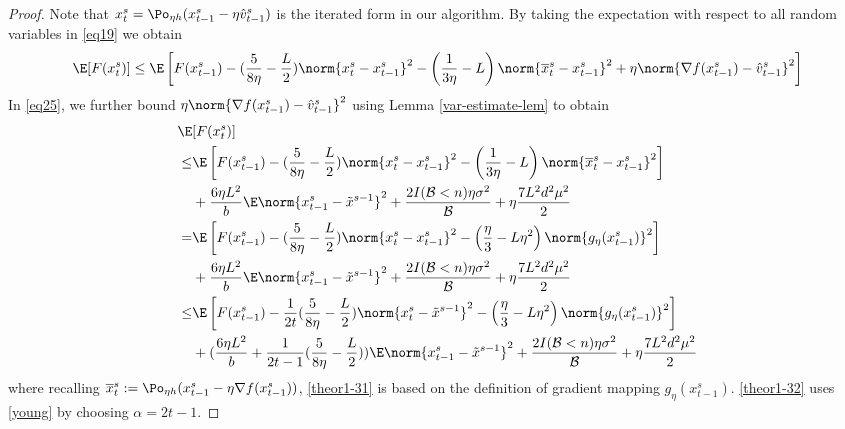 \begin{proof}
Note that $x_t^s = \Po_{\eta h}(x_{t-1}^s - \eta \hat{v}_{t-1}^s)$ is the iterated form in our algorithm.  By taking the expectation with respect to all random variables in \eqref{eq19} we obtain
 \begin{equation}\label{eq25}
 \begin{split} 
\E[F({x}_{t}^s)] \leq \E\left[F({x}_{t-1}^s)  -(\frac{5}{8\eta} - \frac{L}{2})\norm{{x}_t^s-x_{t-1}^s}^2- \left(\frac{1}{3\eta}-L\right)\norm{\overline{x}_t^s-x_{t-1}^s}^2+\eta \norm{\nabla f(x_{t-1}^s)-\hat{v}_{t-1}^s}^2\right]\\
 \end{split}
 \end{equation}
In \eqref{eq25}, we further bound $\eta \norm{\nabla f(x_{t-1}^s)-\hat{v}_{t-1}^s}^2$ using Lemma \ref{var-estimate-lem} to obtain
 \begin{align} 
\E&[F({x}_{t}^s)] \notag
\notag
\\ \leq& \E\left[F({x}_{t-1}^s)  -(\frac{5}{8\eta} - \frac{L}{2})\norm{{x}_t^s-x_{t-1}^s}^2- \left(\frac{1}{3\eta}-L\right)\norm{\overline{x}_t^s-x_{t-1}^s}^2\right]\notag\\
&+ \frac{6\eta L^2}{b}\E\norm{x_{t-1}^s-\tilde{x}^{s-1}}^2 + \frac{2I(\mathcal{B} < n)\eta \sigma ^2}{\mathcal{B}}+\eta \frac{7 L^2 d^2 \mu^2}{2}\notag
\\ =& \E\left[F({x}_{t-1}^s)  -(\frac{5}{8\eta} - \frac{L}{2})\norm{{x}_t^s-x_{t-1}^s}^2- \left(\frac{\eta}{3}-L\eta^2\right)\norm{g_{\eta}(x_{t-1}^s)}^2\right]\notag
\\&+\frac{6\eta L^2}{b}\E\norm{x_{t-1}^s-\tilde{x}^{s-1}}^2+ \frac{2I(\mathcal{B} < n)\eta \sigma ^2}{\mathcal{B}}+\eta \frac{7L^2 d^2 \mu^2}{2}\label{theor1-31}
\\ \leq& \E\left[F({x}_{t-1}^s)  -\frac{1}{2t}(\frac{5}{8\eta} - \frac{L}{2})\norm{{x}_t^s-\tilde{x}^{s-1}}^2- \left(\frac{\eta}{3}-L\eta^2\right)\norm{g_{\eta}(x_{t-1}^s)}^2\right]\notag\\
&+(\frac{6\eta L^2}{b}+\frac{1}{2t-1}(\frac{5}{8\eta} - \frac{L}{2}))\E\norm{x_{t-1}^s-\tilde{x}^{s-1}}^2
+ \frac{2I(\mathcal{B} < n)\eta \sigma ^2}{\mathcal{B}}+\eta \frac{7 L^2 d^2 \mu^2}{2}\label{theor1-32}
 \end{align}
where recalling $\overline{x}_t^s := \Po_{\eta h}(x_{t-1}^s - \eta \nabla f(x_{t-1}^s))$, \eqref{theor1-31}  is based on the definition of gradient mapping $g_{\eta}(x_{t-1}^s)$. \eqref{theor1-32} uses \eqref{young} by choosing $\alpha = 2t-1$.
 

\end{proof}
